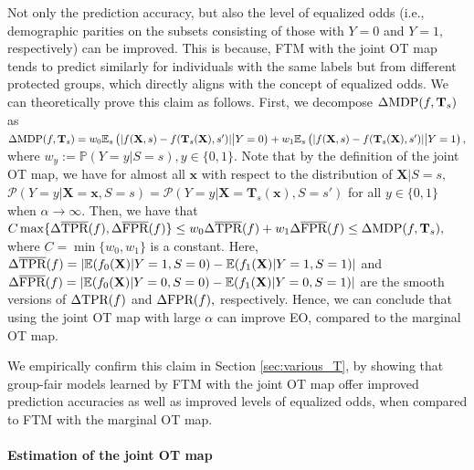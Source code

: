 \documentclass[10pt]{article} %
\begin{document}
Not only the prediction accuracy, but also the level of equalized odds (i.e., demographic parities on the subsets consisting of those with $Y=0$ and $Y=1,$ respectively) can be improved.
This is because, FTM with the joint OT map tends to predict similarly for individuals with the same labels but from different protected groups, which directly aligns with the concept of equalized odds.
We can theoretically prove this claim as follows.
First, we decompose $\Delta \textup{MDP}(f, \mathbf{T}_{s})$ as
$ \Delta \textup{MDP}(f, \mathbf{T}_{s}) 
= w_{0} \mathbb{E}_{s} \left( \vert f(\mathbf{X}, s) - f(\mathbf{T}_{s}(\mathbf{X}), s') \vert \big\vert Y = 0 \right)
+ w_{1} \mathbb{E}_{s} \left( \vert f(\mathbf{X}, s) - f(\mathbf{T}_{s}(\mathbf{X}), s') \vert \big\vert Y = 1 \right),
$
where $w_{y} := \mathbb{P}(Y = y \vert S = s), y \in \{0, 1\}.$
Note that by the definition of the joint OT map, we have for almost all $\mathbf{x}$ with respect to the distribution of $\mathbf{X} \vert S = s,$
$\mathcal{P} (Y = y \vert \mathbf{X} = \mathbf{x}, S = s) = \mathcal{P}(Y = y \vert \mathbf{X} = \mathbf{T}_{s}(\mathbf{x}), S = s')$ for all $y \in \{0, 1\}$ when $\alpha \rightarrow \infty.$
Then, we have that
$C \max\{ \Delta \overline{\textup{TPR}}(f), \Delta \overline{\textup{FPR}}(f) \} 
\le w_{0} \Delta \overline{\textup{TPR}}(f) + w_{1} \Delta \overline{\textup{FPR}}(f) 
\le \Delta \textup{MDP}(f, \mathbf{T}_{s}),$
where $C = \min\{w_{0}, w_{1}\}$ is a constant.
Here, $\Delta \overline{\textup{TPR}}(f) = \vert \mathbb{E}( f_{0}(\mathbf{X}) \vert Y = 1, S = 0 ) - \mathbb{E}( f_{1}(\mathbf{X}) \vert Y = 1, S = 1 ) \vert$ 
and $\Delta \overline{\textup{FPR}}(f) = \vert \mathbb{E}( f_{0}(\mathbf{X}) \vert Y = 0, S = 0 ) - \mathbb{E}( f_{1}(\mathbf{X}) \vert Y = 0, S = 1 ) \vert$
are the smooth versions of $\Delta {\textup{TPR}}(f)$ and $\Delta {\textup{FPR}}(f),$ respectively.
Hence, we can conclude that using the joint OT map with large $\alpha$ can improve EO, compared to the marginal OT map.


We empirically confirm this claim in Section \ref{sec:various_T}, by showing that group-fair models learned by FTM with the joint OT map offer improved prediction accuracies as well as improved levels of equalized odds, when compared to FTM with the marginal OT map.

\paragraph{Estimation of the joint OT map}
\end{document}
